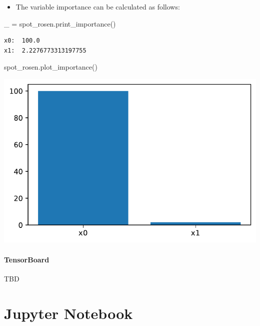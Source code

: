 \documentclass[
  letterpaper,
  DIV=11,
  numbers=noendperiod]{scrreprt}
\let\oldparagraph\paragraph
\renewcommand{\paragraph}[1]{\oldparagraph{#1}\mbox{}}
\newenvironment{Shaded}{\begin{snugshade}}{\end{snugshade}}
\newcommand{\NormalTok}[1]{\textcolor[rgb]{0.00,0.23,0.31}{#1}}
\newcommand{\OperatorTok}[1]{\textcolor[rgb]{0.37,0.37,0.37}{#1}}
\providecommand{\tightlist}{%
  \setlength{\itemsep}{0pt}\setlength{\parskip}{0pt}}\usepackage{longtable,booktabs,array}
\begin{document}
\begin{itemize}
\tightlist
\item
  The variable importance can be calculated as follows:
\end{itemize}

\begin{Shaded}
\begin{Highlighting}[]
\NormalTok{\_ }\OperatorTok{=}\NormalTok{ spot\_rosen.print\_importance()}
\end{Highlighting}
\end{Shaded}

\begin{verbatim}
x0:  100.0
x1:  2.2276773313197755
\end{verbatim}

\begin{Shaded}
\begin{Highlighting}[]
\NormalTok{spot\_rosen.plot\_importance()}
\end{Highlighting}
\end{Shaded}

\includegraphics{009_num_spot_anisotropic_files/figure-pdf/cell-28-output-1.pdf}

\paragraph{TensorBoard}\label{tensorboard-6}

TBD

\section{Jupyter Notebook}\label{jupyter-notebook-8}
\end{document}
